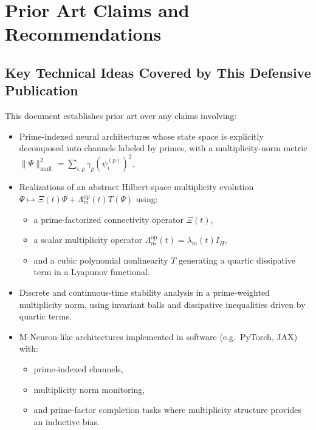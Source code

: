 \documentclass[11pt]{article}
\begin{document}
\section{Prior Art Claims and Recommendations}

\subsection{Key Technical Ideas Covered by This Defensive Publication}

This document establishes prior art over any claims involving:

\begin{itemize}[leftmargin=*]
  \item Prime-indexed neural architectures whose state space is explicitly decomposed into channels labeled by primes, with a multiplicity-norm metric \(\|\Psi\|_{\mathrm{mult}}^2 = \sum_{i,p} \gamma_p (\psi_i^{(p)})^2\).

  \item Realizations of an abstract Hilbert-space multiplicity evolution
  \(\Psi \mapsto \Xi(t)\Psi + \Lambda_m^{\mathrm{op}}(t)T(\Psi)\)
  using:
  \begin{itemize}
    \item a prime-factorized connectivity operator \(\Xi(t)\),
    \item a scalar multiplicity operator \(\Lambda_m^{\mathrm{op}}(t) = \lambda_m(t) I_H\),
    \item and a cubic polynomial nonlinearity \(T\) generating a quartic dissipative term in a Lyapunov functional.
  \end{itemize}

  \item Discrete and continuous-time stability analysis in a prime-weighted multiplicity norm, using invariant balls and dissipative inequalities driven by quartic terms.

  \item M-Neuron-like architectures implemented in software (e.g.\ PyTorch, JAX) with:
  \begin{itemize}
    \item prime-indexed channels,
    \item multiplicity norm monitoring,
    \item and prime-factor completion tasks where multiplicity structure provides an inductive bias.
  \end{itemize}
\end{itemize}
\end{document}
